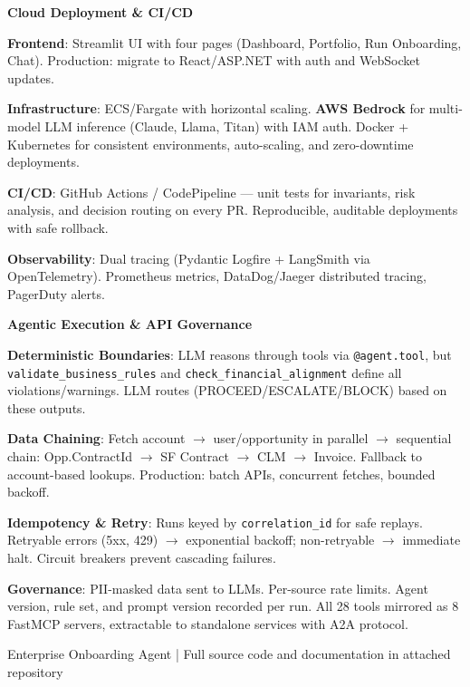 \documentclass[8pt,a4paper]{article}
\begin{document}
\begin{minipage}[t]{0.48\textwidth}
\vspace{0pt}

{\small\bfseries\color{primary} Cloud Deployment \& CI/CD}

\vspace{0.05em}
{\scriptsize
\textbf{Frontend}: Streamlit UI with four pages (Dashboard, Portfolio, Run Onboarding, Chat). Production: migrate to React/ASP.NET with auth and WebSocket updates.

\vspace{0.04em}
\textbf{Infrastructure}: ECS/Fargate with horizontal scaling. \textbf{AWS Bedrock} for multi-model LLM inference (Claude, Llama, Titan) with IAM auth. Docker + Kubernetes for consistent environments, auto-scaling, and zero-downtime deployments.

\vspace{0.04em}
\textbf{CI/CD}: GitHub Actions / CodePipeline --- unit tests for invariants, risk analysis, and decision routing on every PR. Reproducible, auditable deployments with safe rollback.

\vspace{0.04em}
\textbf{Observability}: Dual tracing (Pydantic Logfire + LangSmith via OpenTelemetry). Prometheus metrics, DataDog/Jaeger distributed tracing, PagerDuty alerts.
}
\end{minipage}
\hfill
\begin{minipage}[t]{0.50\textwidth}
\vspace{0pt}

{\small\bfseries\color{primary} Agentic Execution \& API Governance}

\vspace{0.05em}
{\scriptsize
\textbf{Deterministic Boundaries}: LLM reasons through tools via \texttt{@agent.tool}, but \texttt{validate\_business\_rules} and \texttt{check\_financial\_alignment} define all violations/warnings. LLM routes (PROCEED/ESCALATE/BLOCK) based on these outputs.

\vspace{0.04em}
\textbf{Data Chaining}: Fetch account $\rightarrow$ user/opportunity in parallel $\rightarrow$ sequential chain: Opp.ContractId $\rightarrow$ SF Contract $\rightarrow$ CLM $\rightarrow$ Invoice. Fallback to account-based lookups. Production: batch APIs, concurrent fetches, bounded backoff.

\vspace{0.04em}
\textbf{Idempotency \& Retry}: Runs keyed by \texttt{correlation\_id} for safe replays. Retryable errors (5xx, 429) $\rightarrow$ exponential backoff; non-retryable $\rightarrow$ immediate halt. Circuit breakers prevent cascading failures.

\vspace{0.04em}
\textbf{Governance}: PII-masked data sent to LLMs. Per-source rate limits. Agent version, rule set, and prompt version recorded per run. All 28 tools mirrored as 8 FastMCP servers, extractable to standalone services with A2A protocol.
}
\end{minipage}

\vspace{0.2em}
\begin{center}
\textcolor{secondary}{\scriptsize Enterprise Onboarding Agent | Full source code and documentation in attached repository}
\end{center}
\end{document}
